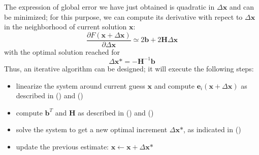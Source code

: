 \documentclass[a4paper, onecolumn]{report}
\begin{document}
The expression of global error we have just obtained is quadratic in $\Delta\textbf{x}$ and can be minimized; for this purpose, we can compute its derivative with repect to $\Delta\textbf{x}$ in the neighborhood of current solution $\textbf{x}$:
\begin{equation}
\frac{\partial F(\textbf{x}+\Delta\textbf{x})}{\partial\Delta\textbf{x}} \simeq 2\textbf{b} + 2\textbf{H}\Delta\textbf{x}
\end{equation}
with the optimal solution reached for 
\begin{equation}
\Delta\textbf{x*} = -\textbf{H}^{-1}\textbf{b}
\end{equation}
Thus, an iterative algorithm can be designed; it will execute the following steps:
\begin{itemize}
	\item{linearize the system around current guess $\textbf{x}$ and compute $\textbf{e}_i(\textbf{x} + \Delta\textbf{x})$ as described in () and ()}
	\item{compute $\textbf{b}^T$ and $\textbf{H}$ as described in () and ()}
	\item{solve the system to get a new optimal increment $\Delta\textbf{x*}$, as indicated in ()}
	\item{update the previous estimate: $\textbf{x} \leftarrow \textbf{x} + \Delta\textbf{x*}$}
\end{itemize}
\end{document}
